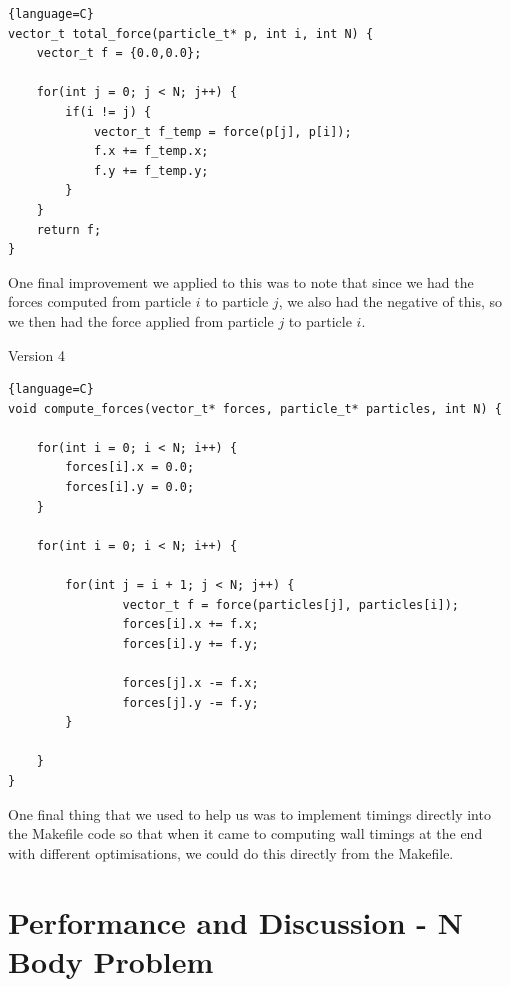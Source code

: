 \documentclass{article}
\begin{document}
\begin{lstlisting}{language=C}
vector_t total_force(particle_t* p, int i, int N) {
    vector_t f = {0.0,0.0};

    for(int j = 0; j < N; j++) {
        if(i != j) {
            vector_t f_temp = force(p[j], p[i]);
            f.x += f_temp.x;
            f.y += f_temp.y;
        }
    }
    return f;
}
\end{lstlisting}
One final improvement we applied to this was to note that since we had the forces computed from particle $i$ to particle $j$, we also had the negative of this, so we then had the force applied from particle $j$ to particle $i$.
\begin{center}
    Version 4
\end{center}
\begin{lstlisting}{language=C}
void compute_forces(vector_t* forces, particle_t* particles, int N) {

    for(int i = 0; i < N; i++) {
        forces[i].x = 0.0;
        forces[i].y = 0.0;
    }

    for(int i = 0; i < N; i++) {

        for(int j = i + 1; j < N; j++) {
                vector_t f = force(particles[j], particles[i]);
                forces[i].x += f.x;
                forces[i].y += f.y;

                forces[j].x -= f.x;
                forces[j].y -= f.y;
        }

    }
}
\end{lstlisting}
One final thing that we used to help us was to implement timings directly into the Makefile code so that when it came to computing wall timings at the end with different optimisations, we could do this directly from the Makefile.
\newpage
\section{Performance and Discussion - N Body Problem}
\end{document}
